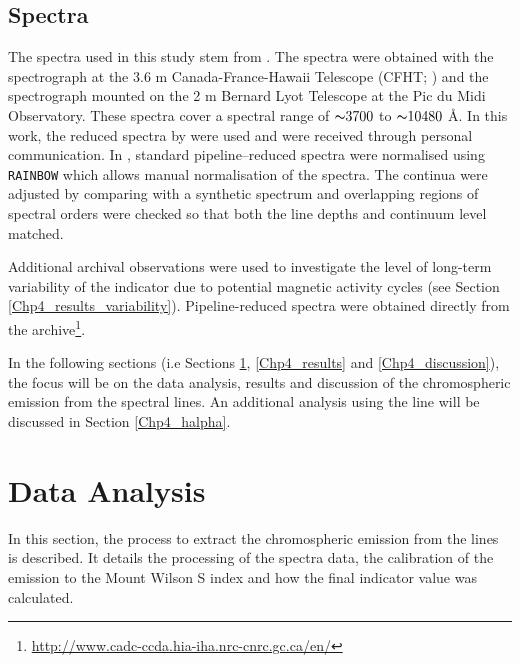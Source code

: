 \subsection{Spectra}
\label{Chp4_obs_spectra}
The spectra used in this study stem from \citet{Bruntt_etal_2012}. The spectra were obtained with the \esp spectrograph at the 3.6 m Canada-France-Hawaii Telescope (CFHT; \citealt{Donati_etal_2006}) and the \narval spectrograph \citep{Auriere_2003} mounted on the 2 m Bernard Lyot Telescope at the Pic du Midi Observatory. These spectra cover a spectral range of ${\thicksim} 3700$ to ${\thicksim} 10480$ \AA. In this work, the reduced spectra by \citet{Bruntt_etal_2012} were used and were received through personal communication. In \citet{Bruntt_etal_2012}, standard pipeline--reduced spectra were normalised using \texttt{RAINBOW} \citep{Bruntt_etal_2010} which allows manual normalisation of the spectra. The continua were adjusted by comparing with a synthetic spectrum and overlapping regions of spectral orders were checked so that both the line depths and continuum level matched.

Additional archival observations were used to investigate the level of long-term variability of the \Rprime indicator due to potential magnetic activity cycles (see Section \ref{Chp4_results_variability}). Pipeline-reduced spectra were obtained directly from the \esp archive\footnote{\url{http://www.cadc-ccda.hia-iha.nrc-cnrc.gc.ca/en/}}.

In the following sections (i.e Sections \ref{Chp4_data_analysis}, \ref{Chp4_results} and \ref{Chp4_discussion}), the focus will be on the data analysis, results and discussion of the chromospheric emission from the \caII spectral lines. An additional analysis using the \Halpha line will be discussed in Section \ref{Chp4_halpha}.

\section{Data Analysis}
\label{Chp4_data_analysis}

In this section, the process to extract the chromospheric emission from the \caII lines is described. It details the processing of the spectra data, the calibration of the emission to the Mount Wilson S index and how the final \Rprime indicator value was calculated.

